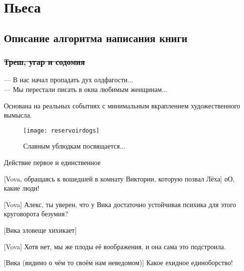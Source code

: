\section*{Пьеса}
\subsection*{Описание алгоритма написания книги}
\subsubsection*{\sout{Треш, угар и содомия}} %
\begin{epigraph}
    --- В нас начал пропадать дух олдфагости...\\
    --- Мы перестали писать в окна любимым женщинам...
\end{epigraph}

Основана на реальных событиях с минимальным вкраплением художественного вымысла.\\ 

\begin{figure}[ht!]
    \centering
    \texttt{[image: reservoirdogs]}
    \caption{Славным ублюдкам посвящается...}
\end{figure}

\begin{center}
\large Действие первое и единственное %
\end{center}


{\small{}}


{\small{}}



[Vova, обращаясь к вошедшей в комнату Виктории, которую позвал Лёха]
оО, какие люди!


[Vova]
Алекс, ты уверен, что у Вика достаточно устойчивая психика для этого круговорота безумия?


[Вика зловеще хихикает]


[Vova]
Хотя нет, мы же плоды её воображения, и она сама это подстроила.


[Вика (видимо о чём то своём нам неведомом)]
Какое ехидное единоборство!


